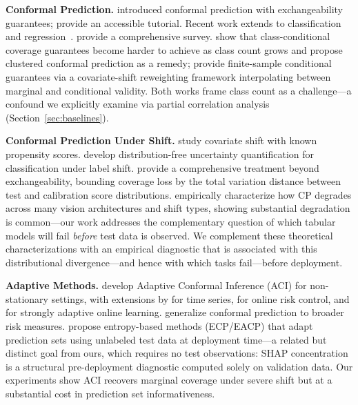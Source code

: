 \documentclass{uai2026} %
\begin{document}
\textbf{Conformal Prediction.} \citet{vovk2005algorithmic} introduced conformal prediction with exchangeability guarantees; \citet{shafer2008tutorial} provide an accessible tutorial. Recent work extends to classification~\citep{romano2020classification,cauchois2021knowing} and regression~\citep{romano2019conformalized,lei2018distribution}. \citet{angelopoulos2023gentle} provide a comprehensive survey. \citet{ding2023class} show that class-conditional coverage guarantees become harder to achieve as class count grows and propose clustered conformal prediction as a remedy; \citet{gibbs2025conditional} provide finite-sample conditional guarantees via a covariate-shift reweighting framework interpolating between marginal and conditional validity. Both works frame class count as a challenge---a confound we explicitly examine via partial correlation analysis (Section~\ref{sec:baselines}).

\textbf{Conformal Prediction Under Shift.} \citet{tibshirani2019conformal} study covariate shift with known propensity scores. \citet{podkopaev2021distribution} develop distribution-free uncertainty quantification for classification under label shift. \citet{barber2023conformal} provide a comprehensive treatment beyond exchangeability, bounding coverage loss by the total variation distance between test and calibration score distributions. \citet{kasa2023empirically} empirically characterize how CP degrades across many vision architectures and shift types, showing substantial degradation is common---our work addresses the complementary question of which tabular models will fail \textit{before} test data is observed. We complement these theoretical characterizations with an empirical diagnostic that is associated with this distributional divergence---and hence with which tasks fail---before deployment.

\textbf{Adaptive Methods.} \citet{gibbs2021adaptive,gibbs2024conformal} develop Adaptive Conformal Inference (ACI) for non-stationary settings, with extensions by \citet{zaffran2022adaptive} for time series, \citet{feldman2023achieving} for online risk control, and \citet{bhatnagar2023improved} for strongly adaptive online learning. \citet{angelopoulos2024conformal} generalize conformal prediction to broader risk measures. \citet{kasa2025adapting} propose entropy-based methods (ECP/EACP) that adapt prediction sets using unlabeled test data at deployment time---a related but distinct goal from ours, which requires no test observations: SHAP concentration is a structural pre-deployment diagnostic computed solely on validation data. Our experiments show ACI recovers marginal coverage under severe shift but at a substantial cost in prediction set informativeness.
\end{document}
